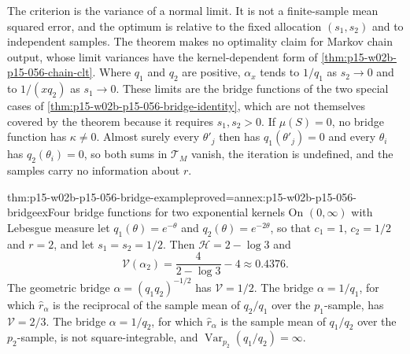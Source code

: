 The criterion is the variance of a normal limit. It is not a
finite-sample mean squared error, and the optimum is relative to the
fixed allocation \((s_1,s_2)\) and to independent samples. The theorem makes
no optimality claim for Markov chain output, whose limit variances have
the kernel-dependent form of \cref{thm:p15-w02b-p15-056-chain-clt}. Where
\(q_1\) and \(q_2\) are positive, \(\alpha_x\) tends to \(1/q_1\) as
\(s_2\to0\) and to \(1/(xq_2)\) as \(s_1\to0\). These limits are the bridge
functions of the two special cases of
\cref{thm:p15-w02b-p15-056-bridge-identity}, which are not themselves
covered by the theorem because it requires \(s_1,s_2>0\). If \(\mu(S)=0\),
no bridge function has \(\kappa\neq0\). Almost surely every
\(\theta'_j\) then has \(q_1(\theta'_j)=0\) and every \(\theta_i\) has
\(q_2(\theta_i)=0\), so both sums in \(\mathcal T_M\) vanish, the
iteration is undefined, and the samples carry no information about \(r\).

\begin{hbtheorem}{thm:p15-w02b-p15-056-bridge-example}{proved=annex:p15-w02b-p15-056-bridgeex}{Four bridge functions for two exponential kernels}
On \((0,\infty)\) with Lebesgue measure let \(q_1(\theta)=e^{-\theta}\)
and \(q_2(\theta)=e^{-2\theta}\), so that \(c_1=1\), \(c_2=1/2\) and
\(r=2\), and let \(s_1=s_2=1/2\). Then
\(\mathcal H=2-\log3\) and
\[
 \mathcal V(\alpha_2)=\frac4{2-\log3}-4\approx0.4376 .
\]
The geometric bridge \(\alpha=(q_1q_2)^{-1/2}\) has
\(\mathcal V=1/2\). The bridge \(\alpha=1/q_1\), for which
\(\widehat r_\alpha\) is the reciprocal of the sample mean of
\(q_2/q_1\) over the \(p_1\)-sample, has \(\mathcal V=2/3\). The bridge
\(\alpha=1/q_2\), for which \(\widehat r_\alpha\) is the sample mean of
\(q_1/q_2\) over the \(p_2\)-sample, is not square-integrable, and
\(\operatorname{Var}_{p_2}(q_1/q_2)=\infty\).
\end{hbtheorem}


